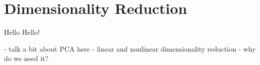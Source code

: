 \chapter{Dimensionality Reduction}\label{chapter:dimensionality-reduction}

Hello Hello! 

- talk a bit about PCA here 
- linear and nonlinear dimensionality reduction 
- why do we need it? 
